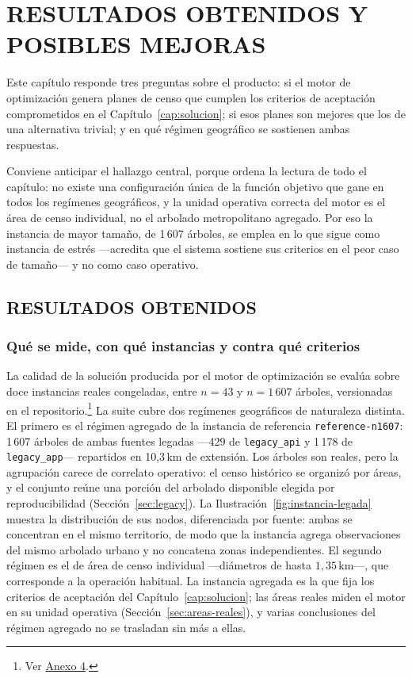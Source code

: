 \chapter{RESULTADOS OBTENIDOS Y POSIBLES MEJORAS}
\label{cap:resultados}

Este capítulo responde tres preguntas sobre el producto: si el motor de optimización genera planes
de censo que cumplen los criterios de aceptación comprometidos en el
Capítulo~\ref{cap:solucion}; si esos planes son mejores que los de una alternativa trivial; y en
qué régimen geográfico se sostienen ambas respuestas.

Conviene anticipar el hallazgo central, porque ordena la lectura de todo el capítulo: no existe una
configuración única de la función objetivo que gane en todos los regímenes geográficos, y la unidad
operativa correcta del motor es el área de censo individual, no el arbolado metropolitano agregado.
Por eso la instancia de mayor tamaño, de 1\,607 árboles, se emplea en lo que sigue como instancia
de estrés ---acredita que el sistema sostiene sus criterios en el peor caso de tamaño--- y no como
caso operativo.

\section{RESULTADOS OBTENIDOS}
\label{sec:resultados-obtenidos}

\subsection{Qué se mide, con qué instancias y contra qué criterios}
\label{sec:protocolo-evaluacion}

La calidad de la solución producida por el motor de optimización se evalúa sobre doce instancias
reales congeladas, entre $n = 43$ y $n = 1\,607$ árboles, versionadas en el
repositorio.\footnote{Ver \hyperref[anx:suite-instancias]{Anexo 4}.} La suite cubre dos regímenes
geográficos de naturaleza distinta. El primero es el régimen agregado de la instancia de referencia
\texttt{reference-n1607}: 1\,607 árboles de ambas fuentes legadas ---429 de \texttt{legacy\_api} y
1\,178 de \texttt{legacy\_app}--- repartidos en 10,3\,km de extensión. Los árboles son reales, pero
la agrupación carece de correlato operativo: el censo histórico se organizó por áreas, y el
conjunto reúne una porción del arbolado disponible elegida por reproducibilidad
(Sección~\ref{sec:legacy}). La Ilustración~\ref{fig:instancia-legada} muestra la distribución de
sus nodos, diferenciada por fuente: ambas se concentran en el mismo territorio, de modo que la
instancia agrega observaciones del mismo arbolado urbano y no concatena zonas independientes. El
segundo régimen es el de área de censo individual ---diámetros de hasta $1{,}35$\,km---, que
corresponde a la operación habitual. La instancia agregada es la que fija los criterios de
aceptación del Capítulo~\ref{cap:solucion}; las áreas reales miden el motor en su unidad operativa
(Sección~\ref{sec:areas-reales}), y varias conclusiones del régimen agregado no se trasladan sin
más a ellas.

